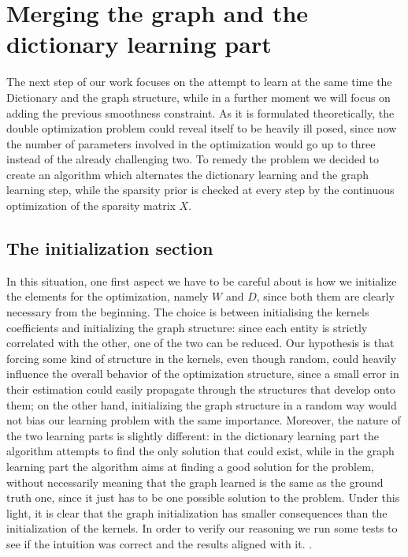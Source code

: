 \chapter{Merging the graph and the dictionary learning part}
\label{sec:GD}
The next step of our work focuses on the attempt to learn at the same time the Dictionary and the graph structure, while in a further moment we will focus on adding the previous smoothness constraint. As it is formulated theoretically, the double optimization problem could reveal itself to be heavily ill posed, since now the number of parameters involved in the optimization would go up to three instead of the already challenging two. To remedy the problem we decided to create an algorithm which alternates the dictionary learning and the graph learning step, while the sparsity prior is checked at every step by the continuous optimization of the sparsity matrix $X$.\\
\section{The initialization section}
In this situation, one first aspect we have to be careful about is how we initialize the elements for the optimization, namely $W$ and $D$, since both them are clearly necessary from the beginning. The choice is between initialising the kernels coefficients and initializing the graph structure: since each entity is strictly correlated with the other, one of the two can be reduced. Our hypothesis is that forcing some kind of structure in the kernels, even though random, could heavily influence the overall behavior of the optimization structure, since a small error in their estimation could easily propagate through the structures that develop onto them; on the other hand, initializing the graph structure in a random way would not bias our learning problem with the same importance. Moreover, the nature of the two learning parts is slightly different: in the dictionary learning part the algorithm attempts to find the only solution that could exist, while in the graph learning part the algorithm aims at finding a good solution for the problem, without necessarily meaning that the graph learned is the same as the ground truth one, since it just has to be one possible solution to the problem. Under this light, it is clear that the graph initialization has smaller consequences than the initialization of the kernels. In order to verify our reasoning we run some tests to see if the intuition was correct and the results aligned with it. .



